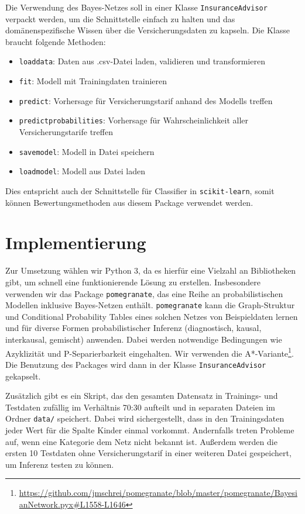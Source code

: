 Die Verwendung des Bayes-Netzes soll in einer Klasse \texttt{InsuranceAdvisor} verpackt werden, um die Schnittstelle einfach zu halten und das domänenspezifische Wissen über die Versicherungsdaten zu kapseln. Die Klasse braucht folgende Methoden:
\begin{itemize}
    \item \texttt{load\textunderscore data}: Daten aus .csv-Datei laden, validieren und transformieren
    \item \texttt{fit}: Modell mit Trainingdaten trainieren
    \item \texttt{predict}: Vorhersage für Versicherungstarif anhand des Modells treffen
    \item \texttt{predict\textunderscore probabilities}: Vorhersage für Wahrscheinlichkeit aller Versicherungstarife treffen
    \item \texttt{save\textunderscore model}: Modell in Datei speichern
    \item \texttt{load\textunderscore model}: Modell aus Datei laden
\end{itemize}
Dies entspricht auch der Schnittstelle für Classifier in \texttt{scikit-learn}, somit können Bewertungsmethoden aus diesem Package verwendet werden.


\section{Implementierung}
Zur Umsetzung wählen wir Python 3, da es hierfür eine Vielzahl an Bibliotheken gibt, um schnell eine funktionierende Lösung zu erstellen. Insbesondere verwenden wir das Package \texttt{pomegranate}, das eine Reihe an probabilistischen Modellen inklusive Bayes-Netzen enthält. \texttt{pomegranate} kann die Graph-Struktur und Conditional Probability Tables eines solchen Netzes von Beispieldaten lernen und für diverse Formen probabilistischer Inferenz (diagnostisch, kausal, interkausal, gemischt) anwenden. Dabei werden notwendige Bedingungen wie Azyklizität und P-Separierbarkeit eingehalten. Wir verwenden die A*-Variante\footnote{\url{https://github.com/jmschrei/pomegranate/blob/master/pomegranate/BayesianNetwork.pyx#L1558-L1646}}. Die Benutzung des Packages wird dann in der Klasse \texttt{InsuranceAdvisor} gekapselt.

Zusätzlich gibt es ein Skript, das den gesamten Datensatz in Trainings- und Testdaten zufällig im Verhältnis 70:30 aufteilt und in separaten Dateien im  Ordner \texttt{data/} speichert. Dabei wird sichergestellt, dass in den Trainingsdaten jeder Wert für die Spalte Kinder einmal vorkommt. Andernfalls treten Probleme auf, wenn eine Kategorie dem Netz nicht bekannt ist. Außerdem werden die ersten 10 Testdaten ohne Versicherungstarif in einer weiteren Datei gespeichert, um Inferenz testen zu können.


